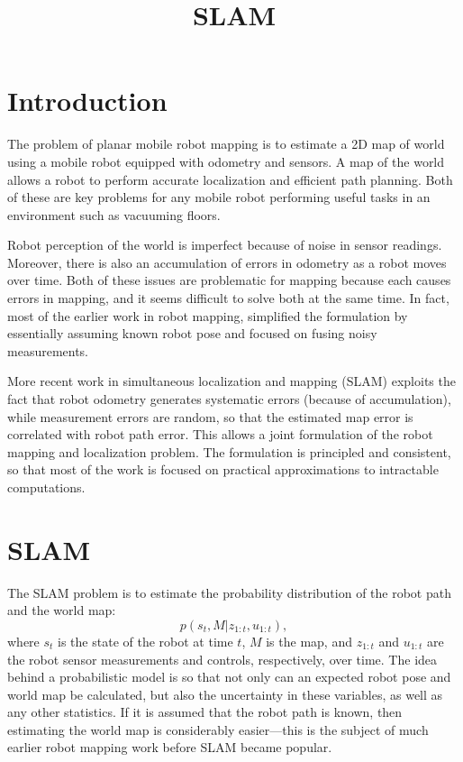 \documentclass{article}
\begin{document}
\title{SLAM}
\date{}
\maketitle

\section{Introduction}

The problem of planar mobile robot mapping is to estimate a 2D map of world using a mobile robot equipped with odometry and sensors.  A map of the world allows a robot to perform accurate localization and efficient path planning.  Both of these are key problems for any mobile robot performing useful tasks in an environment such as vacuuming floors.

Robot perception of the world is imperfect because of noise in sensor readings.  Moreover, there is also an accumulation of errors in odometry as a robot moves over time.  Both of these issues are problematic for mapping because each causes errors in mapping, and it seems difficult to solve both at the same time.  In fact, most of the earlier work in robot mapping, simplified the formulation by essentially assuming known robot pose and focused on fusing noisy measurements.

More recent work in simultaneous localization and mapping (SLAM) exploits the fact that robot odometry generates systematic errors (because of accumulation), while measurement errors are random, so that the estimated map error is correlated with robot path error.  This allows a joint formulation of the robot mapping and localization problem.  The formulation is principled and consistent, so that most of the work is focused on practical approximations to intractable computations.

\section{SLAM}

The SLAM problem is to estimate the probability distribution of the robot path and the world map:
\begin{equation}
p(s_t, M | z_{1:t}, u_{1:t}),
\end{equation}
where $s_t$ is the state of the robot at time $t$, $M$ is the map, and $z_{1:t}$ and $u_{1:t}$ are the robot sensor measurements and controls, respectively, over time.  The idea behind a probabilistic model is so that not only can an expected robot pose and world map be calculated, but also the uncertainty in these variables, as well as any other statistics.  If it is assumed that the robot path is known, then estimating the world map is considerably easier---this is the subject of much earlier robot mapping work before SLAM became popular.
\end{document}
